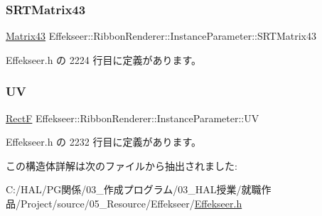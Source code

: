 \subsubsection{\texorpdfstring{S\+R\+T\+Matrix43}{SRTMatrix43}}
{\footnotesize\ttfamily \mbox{\hyperlink{struct_effekseer_1_1_matrix43}{Matrix43}} Effekseer\+::\+Ribbon\+Renderer\+::\+Instance\+Parameter\+::\+S\+R\+T\+Matrix43}



 Effekseer.\+h の 2224 行目に定義があります。

\mbox{\label{struct_effekseer_1_1_ribbon_renderer_1_1_instance_parameter_ae15daebe5ddca6f33083976153344531}} 
\subsubsection{\texorpdfstring{UV}{UV}}
{\footnotesize\ttfamily \mbox{\hyperlink{struct_effekseer_1_1_rect_f}{RectF}} Effekseer\+::\+Ribbon\+Renderer\+::\+Instance\+Parameter\+::\+UV}



 Effekseer.\+h の 2232 行目に定義があります。



この構造体詳解は次のファイルから抽出されました\+:\begin{DoxyCompactItemize}
\item 
C\+:/\+H\+A\+L/\+P\+G関係/03\+\_\+作成プログラム/03\+\_\+\+H\+A\+L授業/就職作品/\+Project/source/05\+\_\+\+Resource/\+Effekseer/\mbox{\hyperlink{_effekseer_8h}{Effekseer.\+h}}\end{DoxyCompactItemize}
